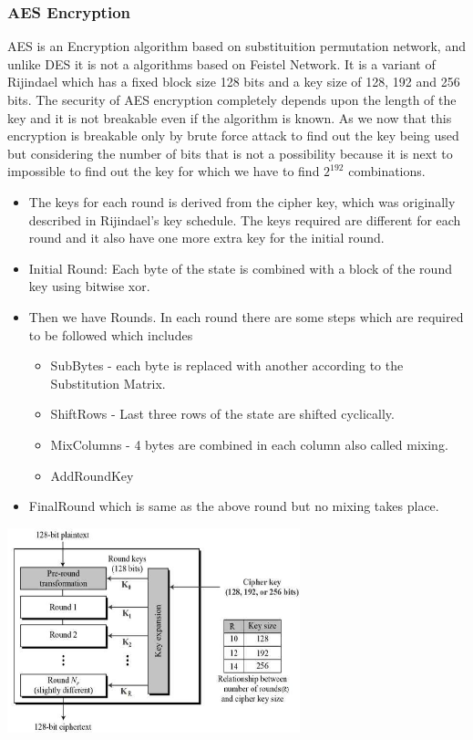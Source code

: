 \documentclass[conference]{IEEEtran}
\begin{document}
\subsubsection{AES Encryption}
\begin{flushleft}
AES is an Encryption algorithm based on substituition permutation network, and unlike DES it is not a algorithms based on Feistel Network. It is a variant of Rijindael which has a fixed block size 128 bits and a key size of 128, 192 and 	256 bits.
\linebreak
The security of AES encryption completely depends upon the length of the key and it is not breakable even if the algorithm is known. As we now that this encryption is breakable only by brute force attack to find out the key being used but considering the number of bits that is not a possibility because it is next to impossible to find out the key for which we have to find \(2^{192}\) combinations.
\begin{itemize}
  \item The keys for each round is derived from the cipher key, which was originally described in Rijindael's key schedule. The keys required are different for each round and it also have one more extra key for the initial round.
  \item Initial Round: Each byte of the state is combined with a block of the round key using bitwise xor.
  \item Then we have Rounds. In each round there are some steps which are required to be followed which includes
  \begin{itemize}
  \item SubBytes - each byte is replaced with another according to the Substitution Matrix.
  \item ShiftRows - Last three rows of the state are shifted cyclically.
  \item MixColumns - 4 bytes are combined in each column also called mixing.
  \item AddRoundKey
  \end{itemize}
  \item FinalRound which is same as the above round but no mixing takes place.
\end{itemize}

\includegraphics[width=8.5cm]{aes_structure}
\end{flushleft}
\end{document}
